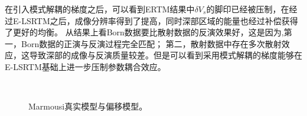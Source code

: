 在引入模式解耦的梯度之后，可以看到ERTM结果中$\delta
V_s$的脚印已经被压制，在经过E-LSRTM之后，成像分辨率得到了提高，同时深部区域的能量也经过补偿获得了更好的均衡。
从结果上看Born数据要比散射数据的反演效果好，这是因为,第一，Born数据的正演与反演过程完全匹配；
第二，散射数据中存在多次散射效应，这导致深部的成像与反演质量较差。但是可以看到采用模式解耦的梯度能够在E-LSRTM基础上进一步压制参数耦合效应。
\begin{figure}[!htb]
   \centering
   \\
   \caption{Marmousi真实模型与偏移模型。}
   \label{fig:TrueAndInitial_2}
\end{figure}

